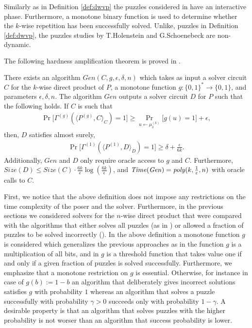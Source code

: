 Similarly as in Definition \ref{def:dwvp} the puzzles considered in \cite{DBLP:journals/corr/abs-1002-3534} have
an interactive phase. Furthermore, a monotone binary function is used to determine whether the $k$-wise repetition
has been successfully solved. Unlike, puzzles in Definition \ref{def:dwvp}, the puzzles studies by T.Holenstein and G.Schoenebeck
are non-dynamic.

The following hardness amplification theorem is proved in \cite{DBLP:journals/corr/abs-1002-3534}.
\begin{theorem}
There exists an algorithm $\mathit{Gen}(C,g,\epsilon, \delta, n)$ which takes as input a solver circuit $C$ for the $k$-wise
direct product of $P$, a monotone function $g: \{0,1\}^{*} \rightarrow \{0,1\}$, and parameters $\epsilon,\delta,n$.
The algorithm $\mathit{Gen}$ outputs a solver circuit $D$ for $P$ such that the following holds.
If $C$ is such that
\begin{align*}
\Pr\Big[\Gamma^{(g)}(\langle P^{(g)}, C \rangle_C) = 1\Big] \geq \Pr_{u \leftarrow \mu_{\delta}^{(k)}} \Big[ g(u) = 1 \Big] + \epsilon,
\end{align*}
then, $D$ satisfies almost surely,
\begin{align*}
  \Pr\Big[ \Gamma^{(1)}(\langle P^{(1)}, D\rangle_{D}) = 1\Big] \geq \delta + \frac{\epsilon}{6k}.
\end{align*}
Additionally, $\mathit{Gen}$ and $D$ only require oracle access to $g$ and $C$.
Furthermore, $\mathit{Size}(D) \leq \mathit{Size}(C) \cdot \frac{6k}{\epsilon} \log(\frac{6k}{\epsilon})$,
and $\operatorname{\mathit{Time}} (\mathit{Gen}) = \operatorname{\mathit{poly}}(k, \frac{1}{\varepsilon}, n)$ with oracle calls to $C$.
\end{theorem}

First, we notice that the above definition does not impose any restrictions on the time complexity of the poser and the solver.
Furthermore, in the previous sections we considered solvers for the $n$-wise direct product that were compared with the algorithms that either
solves all puzzles (as in \cite{canetti2004hardness}) or allowed a fraction of puzzles to be solved incorrectly (\cite{Dodis:2009:SAI:1530441.1530450}).
In the above definition a monotone function $g$ is considered which generalizes the previous approaches as in \cite{canetti2004hardness}
the function $g$ is a multiplication of all bits, and in \cite{Dodis:2009:SAI:1530441.1530450} $g$ is a threshold function that takes value
one if and only if a given fraction of puzzles is solved successfully.
Furthermore, we emphasize that a monotone restriction on $g$ is essential. Otherwise, for instance in case of $g(b) := 1 - b$ an algorithm that
deliberately gives incorrect solutions satisfies $g$ with probability $1$ whereas an algorithm that solves a puzzle successfully with probability
$\gamma > 0$ succeeds only with probability $1 - \gamma$.
A desirable property is that an algorithm that solves puzzles with the higher probability is not worser than an algorithm that success probability is lower.


